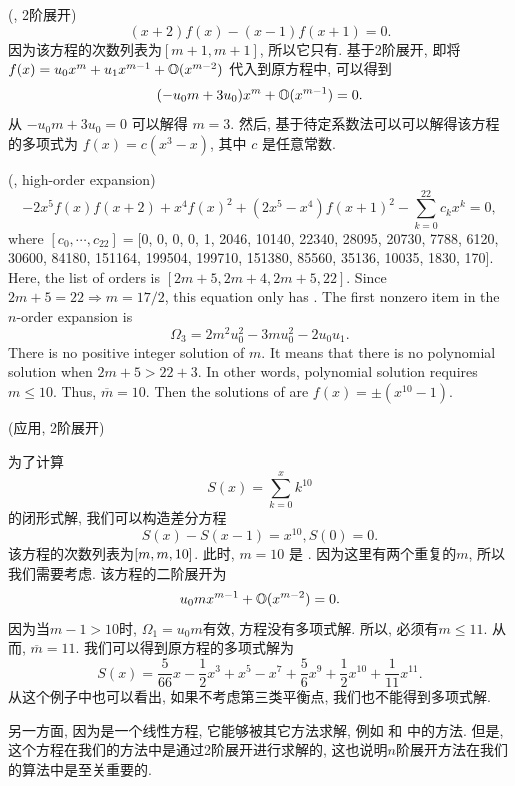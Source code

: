 \begin{example}
(\BPthree{}, 2阶展开)
\begin{equation}
(x+2)f(x)-(x-1)f(x+1)=0. \label{ep3}
\end{equation}
因为该方程的次数列表为$[m+1,m+1]$, 所以它只有\BPthree{}. 基于2阶展开, 即将$f(x)=u_0 x^m + u_1 x^{m-1} + \mathbb O(x^{m-2})$ 代入到原方程中, 可以得到
\begin{equation}
(-u_0 m+3u_0)x^m+\mathbb O(x^{m-1})=0.
\end{equation}
从 $-u_0 m+3u_0=0$ 可以解得 $m=3$. 然后, 基于待定系数法可以可以解得该方程的多项式为 $f(x)=c(x^3-x)$, 其中 $c$ 是任意常数.
\end{example}

\begin{example}
(\BPthree{}, high-order expansion)
\begin{equation}
-2x^5f(x)f(x+2)+x^4f(x)^2+(2x^5-x^4)f(x+1)^2-\sum_{k=0}^{22}{c_k x^k}=0, \label{ep4}
\end{equation}
where $[c_0,\cdots,c_{22}]=$[0, 0, 0, 0, 1, 2046, 10140, 22340, 28095, 20730, 7788, 6120, 30600, 84180, 151164, 199504, 199710, 151380, 85560, 35136, 10035, 1830, 170]. Here, the list of orders is $[2m+5,2m+4,2m+5,22]$. Since $2m+5=22\Rightarrow m=17/2$, this equation only has \BPthree{}. The first nonzero item in the $n$-order expansion is
\begin{equation}
\Omega_3 = 2m^2u_0^2-3mu_0^2-2u_0u_1.
\end{equation}
There is no positive integer solution of $m$. It means that there is no polynomial solution when $2m+5 > 22+3$. In other words, polynomial solution requires $m\le 10$. Thus, $\overline m =10$. Then the solutions of  are $f(x)=\pm (x^{10}-1)$.
\end{example}

\begin{example}
(应用, 2阶展开)

为了计算 
\begin{equation}
    S(x)=\sum_{k=0}^x{k^{10}}
\end{equation}
的闭形式解, 我们可以构造差分方程
\begin{equation}
    S(x)-S(x-1)=x^{10}, S(0)=0. \label{seq}
\end{equation}
该方程的次数列表为$\left[m,m,10\right]$. 此时, $m=10$ 是 \BPone{}. 因为这里有两个重复的$m$, 所以我们需要考虑\BPthree{}. 该方程的二阶展开为
\begin{equation}
u_0m x^{m-1}+\mathbb O(x^{m-2})=0.   
\end{equation}
因为当$m-1>10$时, $\Omega_1=u_0m$有效, 方程没有多项式解. 所以, 必须有$m\le 11$. 从而, $\overline m=11$. 我们可以得到原方程的多项式解为
\begin{equation}
S(x)=\frac{5}{66}x-\frac{1}{2}x^3+x^5-x^7+\frac{5}{6}x^9+\frac{1}{2}x^{10}+\frac{1}{11}x^{11}.
\end{equation}
从这个例子中也可以看出, 如果不考虑第三类平衡点, 我们也不能得到多项式解. 

另一方面, 因为是一个线性方程, 它能够被其它方法求解, 例如  和  中的方法. 但是, 这个方程在我们的方法中是通过2阶展开进行求解的, 这也说明$n$阶展开方法在我们的算法中是至关重要的.  
\end{example}

